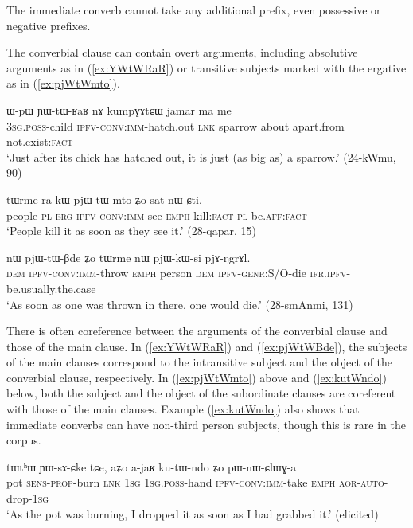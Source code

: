The immediate converb cannot take any additional prefix, even possessive or negative prefixes.

The converbial clause can contain overt arguments, including  absolutive arguments as in (\ref{ex:YWtWRaR}) or transitive subjects marked with the ergative as in (\ref{ex:pjWtWmto}). 

\begin{exe}
\ex \label{ex:YWtWRaR} 
\gll  ɯ-pɯ ɲɯ-tɯ-ʁaʁ nɤ kumpɣɤtɕɯ jamar ma me	\\
\textsc{3sg}.\textsc{poss}-child \textsc{ipfv}-\textsc{conv}:\textsc{imm}-hatch.out \textsc{lnk} sparrow about apart.from not.exist:\textsc{fact} \\
\glt `Just after its chick has hatched out, it is just (as big as) a sparrow.' (24-kWmu, 90)
\end{exe}

\begin{exe}
\ex \label{ex:pjWtWmto}
\gll tɯrme ra kɯ pjɯ-tɯ-mto ʑo sat-nɯ ɕti.    \\
people \textsc{pl} \textsc{erg} \textsc{ipfv}-\textsc{conv}:\textsc{imm}-see \textsc{emph} kill:\textsc{fact}-\textsc{pl} be.\textsc{aff}:\textsc{fact} \\
\glt  `People kill it as soon as they see it.' (28-qapar, 15)
\end{exe}


\begin{exe}
\ex \label{ex:pjWtWBde} 
\gll nɯ pjɯ-tɯ-βde ʑo tɯrme nɯ pjɯ-kɯ-si pjɤ-ŋgrɤl. \\
\textsc{dem} \textsc{ipfv}-\textsc{conv}:\textsc{imm}-throw \textsc{emph} person \textsc{dem} \textsc{ipfv}-\textsc{genr}:S/O-die \textsc{ifr}.\textsc{ipfv}-be.usually.the.case \\
\glt `As soon as one was thrown in there, one would die.' (28-smAnmi, 131)
\end{exe}

There is often coreference between the arguments of the converbial clause and those of the main clause. In (\ref{ex:YWtWRaR}) and (\ref{ex:pjWtWBde}), the subjects of the main clauses correspond to the intransitive subject and the object of the converbial clause, respectively. In (\ref{ex:pjWtWmto}) above and (\ref{ex:kutWndo}) below, both the subject and the object of the subordinate clauses are coreferent with those of the main clauses. Example (\ref{ex:kutWndo}) also shows that immediate converbs can have non-third person subjects, though this is rare in the corpus.

\begin{exe}
\ex \label{ex:kutWndo} 
\gll tɯtʰɯ ɲɯ-sɤ-ɕke tɕe, aʑo a-jaʁ ku-tɯ-ndo ʑo pɯ-nɯ-ɕlɯɣ-a \\
pot \textsc{sens}-\textsc{prop}-burn \textsc{lnk} \textsc{1sg} \textsc{1sg}.\textsc{poss}-hand \textsc{ipfv}-\textsc{conv}:\textsc{imm}-take \textsc{emph} \textsc{aor}-\textsc{auto}-drop-\textsc{1sg} \\
\glt `As the pot was burning, I dropped it as soon as I had grabbed it.' (elicited)
\end{exe}

